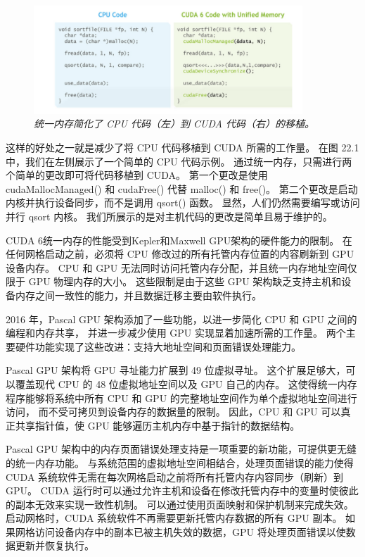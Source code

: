 \begin{figure}[H]
	\centering
	\includegraphics[width=0.9\textwidth]{figs/F22.1.png}
	\caption{\textit{统一内存简化了 CPU 代码（左）到 CUDA 代码（右）的移植。}}
\end{figure}

这样的好处之一就是减少了将 CPU 代码移植到 CUDA 所需的工作量。 在图 22.1 中，我们在左侧展示了一个简单的 CPU 代码示例。 
通过统一内存，只需进行两个简单的更改即可将代码移植到 CUDA。 
第一个更改是使用 cudaMallocManaged() 和 cudaFree() 代替 malloc() 和 free()。 
第二个更改是启动内核并执行设备同步，而不是调用 qsort() 函数。 
显然，人们仍然需要编写或访问并行 qsort 内核。 我们所展示的是对主机代码的更改是简单且易于维护的。

CUDA 6统一内存的性能受到Kepler和Maxwell GPU架构的硬件能力的限制。 
在任何网格启动之前，必须将 CPU 修改过的所有托管内存位置的内容刷新到 GPU 设备内存。 
CPU 和 GPU 无法同时访问托管内存分配，并且统一内存地址空间仅限于 GPU 物理内存的大小。 
这些限制是由于这些 GPU 架构缺乏支持主机和设备内存之间一致性的能力，并且数据迁移主要由软件执行。

2016 年，Pascal GPU 架构添加了一些功能，以进一步简化 CPU 和 GPU 之间的编程和内存共享，
并进一步减少使用 GPU 实现显着加速所需的工作量。 两个主要硬件功能实现了这些改进：支持大地址空间和页面错误处理能力。

Pascal GPU 架构将 GPU 寻址能力扩展到 49 位虚拟寻址。 
这个扩展足够大，可以覆盖现代 CPU 的 48 位虚拟地址空间以及 GPU 自己的内存。 
这使得统一内存程序能够将系统中所有 CPU 和 GPU 的完整地址空间作为单个虚拟地址空间进行访问，
而不受可拷贝到设备内存的数据量的限制。 因此，CPU 和 GPU 可以真正共享指针值，使 GPU 能够遍历主机内存中基于指针的数据结构。

Pascal GPU 架构中的内存页面错误处理支持是一项重要的新功能，可提供更无缝的统一内存功能。 
与系统范围的虚拟地址空间相结合，处理页面错误的能力使得 CUDA 系统软件无需在每次网格启动之前将所有托管内存内容同步（刷新）到 GPU。 
CUDA 运行时可以通过允许主机和设备在修改托管内存中的变量时使彼此的副本无效来实现一致性机制。 
可以通过使用页面映射和保护机制来完成失效。 启动网格时，CUDA 系统软件不再需要更新托管内存数据的所有 GPU 副本。 
如果网格访问设备内存中的副本已被主机失效的数据，GPU 将处理页面错误以使数据更新并恢复执行。

